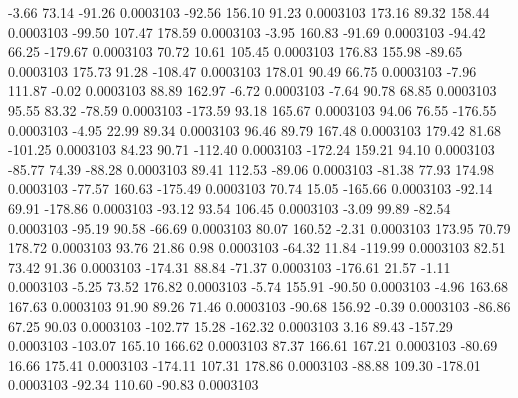        -3.66       73.14      -91.26     0.0003103
      -92.56      156.10       91.23     0.0003103
      173.16       89.32      158.44     0.0003103
      -99.50      107.47      178.59     0.0003103
       -3.95      160.83      -91.69     0.0003103
      -94.42       66.25     -179.67     0.0003103
       70.72       10.61      105.45     0.0003103
      176.83      155.98      -89.65     0.0003103
      175.73       91.28     -108.47     0.0003103
      178.01       90.49       66.75     0.0003103
       -7.96      111.87       -0.02     0.0003103
       88.89      162.97       -6.72     0.0003103
       -7.64       90.78       68.85     0.0003103
       95.55       83.32      -78.59     0.0003103
     -173.59       93.18      165.67     0.0003103
       94.06       76.55     -176.55     0.0003103
       -4.95       22.99       89.34     0.0003103
       96.46       89.79      167.48     0.0003103
      179.42       81.68     -101.25     0.0003103
       84.23       90.71     -112.40     0.0003103
     -172.24      159.21       94.10     0.0003103
      -85.77       74.39      -88.28     0.0003103
       89.41      112.53      -89.06     0.0003103
      -81.38       77.93      174.98     0.0003103
      -77.57      160.63     -175.49     0.0003103
       70.74       15.05     -165.66     0.0003103
      -92.14       69.91     -178.86     0.0003103
      -93.12       93.54      106.45     0.0003103
       -3.09       99.89      -82.54     0.0003103
      -95.19       90.58      -66.69     0.0003103
       80.07      160.52       -2.31     0.0003103
      173.95       70.79      178.72     0.0003103
       93.76       21.86        0.98     0.0003103
      -64.32       11.84     -119.99     0.0003103
       82.51       73.42       91.36     0.0003103
     -174.31       88.84      -71.37     0.0003103
     -176.61       21.57       -1.11     0.0003103
       -5.25       73.52      176.82     0.0003103
       -5.74      155.91      -90.50     0.0003103
       -4.96      163.68      167.63     0.0003103
       91.90       89.26       71.46     0.0003103
      -90.68      156.92       -0.39     0.0003103
      -86.86       67.25       90.03     0.0003103
     -102.77       15.28     -162.32     0.0003103
        3.16       89.43     -157.29     0.0003103
     -103.07      165.10      166.62     0.0003103
       87.37      166.61      167.21     0.0003103
      -80.69       16.66      175.41     0.0003103
     -174.11      107.31      178.86     0.0003103
      -88.88      109.30     -178.01     0.0003103
      -92.34      110.60      -90.83     0.0003103
